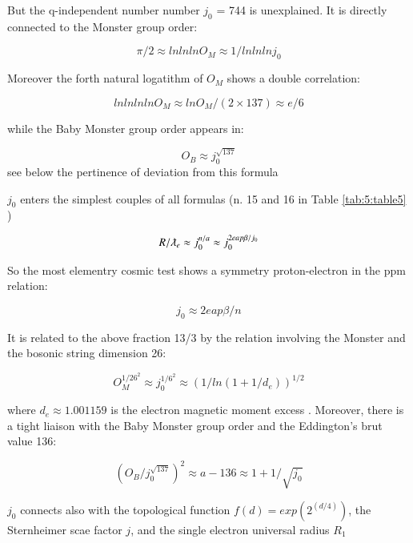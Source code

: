 \documentclass[a4paper,9pt]{article}
\begin{document}
But the q-independent number number $j_0$ = 744 is unexplained. It is directly connected to the Monster group order:

 \begin{equation}
 \pi/2 \approx lnlnlnO_M \approx 1/lnlnlnj_0
\end{equation}

Moreover the forth natural logatithm of $O_M$ shows a double correlation:

 \begin{equation}
 lnlnlnlnO_M \approx lnO_M /(2\times 137) \approx e/6
\end{equation}

while the Baby Monster group order appears in:

\begin{equation}
 O_B \approx j_0^{\sqrt{137}}
\end{equation}
see below the pertinence of deviation from this formula

$j_0$ enters the simplest couples of all formulas (n. 15 and 16 in 
 Table \ref{tab:5:table5} )
 
 \begin{equation}
 R/\lambdabar_e \approx j_0^{n/a} \approx j_0^{2eap\beta/j_0} 
\end{equation}

So the most elementry cosmic test shows a symmetry proton-electron in the ppm relation:

\begin{equation}
j_0 \approx 2eap\beta/n 
\end{equation}


It is related to the above fraction 13/3 by the relation involving the Monster and the bosonic string dimension 26:

\begin{equation}
  O_M^{1/26^2} \approx j_0^{1/6^2}\approx (1/ln(1+1/d_e))^{1/2}   
\end{equation}

where $d_e \approx 1.001159$ is the electron magnetic moment excess \cite{Tanabashi}.
 Moreover, there is a tight liaison with the Baby Monster group order and the Eddington's brut value 136:
 
 \begin{equation}
 ( O_B/ j_0^{\sqrt{137}})^2 \approx a -136 \approx 1 + 1/\sqrt{j_0}
\end{equation}

$j_0$ connects also with the topological function $f(d ) = exp(2^(d/4))$, the Sternheimer scae factor $j$, and the single electron universal radius $R_1$ \cite{Sanchez}
 
\end{document}
